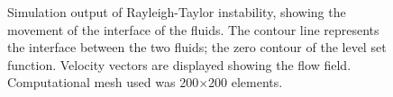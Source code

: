 \begin{figure}
\caption{Simulation output of Rayleigh-Taylor instability, showing the movement of the interface of the fluids. The contour line represents the interface between the two fluids; the zero contour of the level set function. Velocity vectors are displayed showing the flow field. Computational mesh used was 200$\times$200 elements.}
\label{RT2D OUTPUT1}
\end{figure}
